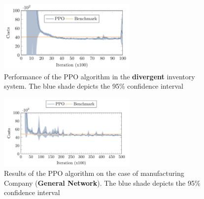 \documentclass[12pt]{article}
\begin{document}
\begin{figure}[H]
    \centering
    \includegraphics[width=0.6\textwidth]{Images/divergentnetwork.png}
    \caption{Performance of the PPO algorithm in the \textbf{divergent} inventory system. The blue shade depicts the 95\% confidence interval}
    \label{fig:5-divergentnetwork}
\end{figure} 

\begin{figure}[H]
    \centering
    \includegraphics[width=0.6\textwidth]{Images/generalnetwork.png}
    \caption{Results of the PPO algorithm on the case of manufacturing Company (\textbf{General Network}). The blue shade depicts the 95\% confidence interval}
    \label{fig:5-generalnetwork}
\end{figure} 

\newpage



\end{document}
